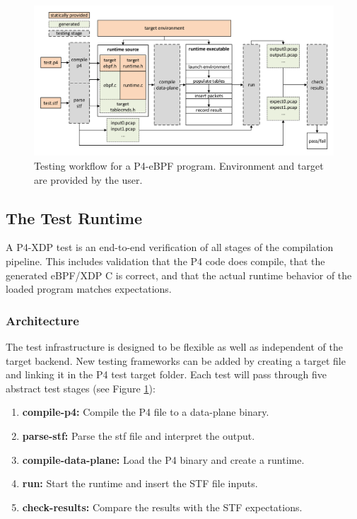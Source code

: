\begin{figure}
	\centering
	\includegraphics[width=\linewidth]{testing_workflow}
	\caption{Testing workflow for a P4-eBPF program. Environment and 
		target are provided by the user.}
	\label{fig:p4_testflow}
\end{figure}

\subsection{The Test Runtime}
A P4-XDP test is an end-to-end verification of all stages of 
the compilation pipeline. This includes validation that the P4 code does 
compile, that the generated eBPF/XDP C is correct, and that the actual runtime 
behavior of the loaded program matches expectations.

\subsubsection{Architecture}
The test infrastructure is designed to be flexible as well as independent of 
the target backend. New testing frameworks can be added by creating a target 
file and linking it in the P4 test target folder. Each test will pass through 
five abstract test stages (see Figure \ref{fig:p4_testflow}):\\
\begin{enumerate}
\item\textbf{compile-p4:} Compile the P4 file to a data-plane binary.
\item \textbf{parse-stf:} Parse the stf file and interpret the output.
\item \textbf{compile-data-plane:} Load the P4 binary and create a runtime.
\item \textbf{run:} Start the runtime and insert the STF file inputs.
\item \textbf{check-results:} Compare the results with the STF 
expectations.
\end{enumerate}


